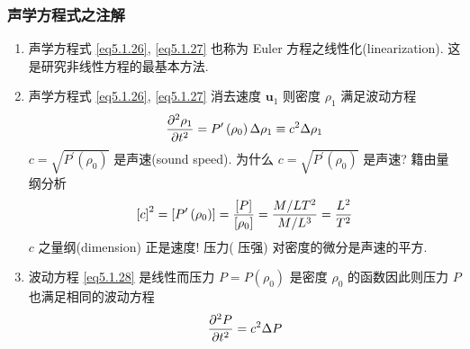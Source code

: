 \documentclass[aspectratio=2516]{beamer}
\begin{document}
\begin{frame}
\frametitle{\kaishu 声学方程式之注解}

\kaishu 

\small 

\begin{enumerate}
	\item 声学方程式 \ref{eq5.1.26}, \ref{eq5.1.27} 也称为 Euler 方程之线性化(linearization). 这是研究非线性方程的最基本方法.
	\item 声学方程式 \ref{eq5.1.26}, \ref{eq5.1.27} 消去速度 $ \boldsymbol{u}_{1} $ 则密度 $ \rho_1 $ 满足波动方程
	\begin{equation}
	\tiny
	\frac{{{\partial ^2}{\rho _1}}}{{\partial {t^2}}} = {P^{\prime}}\left( {{\rho _0}} \right)\Delta {\rho _1} \equiv {c^2}\Delta {\rho _1}
	\label{eq5.1.28}
	\end{equation}
	$c = \sqrt {{P^{\prime}}\left( {{\rho _0}} \right)} $ 是声速(sound speed). 为什么 $c = \sqrt {{P^{\prime}}\left( {{\rho _0}} \right)} $  是声速? 籍由量纲分析
	\begin{equation}
	\tiny 
	{\left[ c \right]^2} = \left[ {{P^{\prime}}\left( {{\rho _0}} \right)} \right] = \frac{{\left[ P \right]}}{{\left[ {{\rho _0}} \right]}} = \frac{{{M \mathord{\left/
					{\vphantom {M {L{T^2}}}} \right.
					\kern-\nulldelimiterspace} {L{T^2}}}}}{{{M \mathord{\left/
					{\vphantom {M {{L^3}}}} \right.
					\kern-\nulldelimiterspace} {{L^3}}}}} = \frac{{{L^2}}}{{{T^2}}}
	\notag
	\end{equation}
	$ c $ 之量纲(dimension) 正是速度! 压力({\color{red} 压强}) 对密度的微分是声速的平方. 
	\item 波动方程 \ref{eq5.1.28} 是线性而压力 $P = P\left( {{\rho _0}} \right)$ 是密度 $ \rho_0 $ 的函数因此则压力 $ P $ 也满足相同的波动方程
	\begin{equation}
	\tiny 
	\frac{{{\partial ^2}P}}{{\partial {t^2}}} = {c^2}\Delta P
	\label{eq5.1.29}
	\end{equation}

\end{enumerate}

\end{frame}

\end{document}

